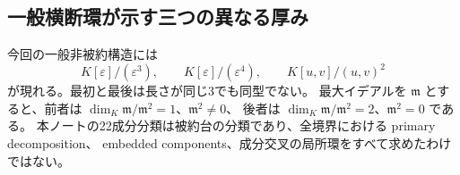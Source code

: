 \subsection{一般横断環が示す三つの異なる厚み}
今回の一般非被約構造には
\[
 K[\varepsilon]/(\varepsilon^3),\qquad
 K[\varepsilon]/(\varepsilon^4),\qquad
 K[u,v]/(u,v)^2
\]
が現れる。最初と最後は長さが同じ3でも同型でない。
最大イデアルを $\mathfrak m$ とすると、前者は
$\dim_K\mathfrak m/\mathfrak m^2=1$、$\mathfrak m^2\ne0$、
後者は $\dim_K\mathfrak m/\mathfrak m^2=2$、$\mathfrak m^2=0$ である。
本ノートの22成分分類は被約台の分類であり、全境界における primary decomposition、
embedded components、成分交叉の局所環をすべて求めたわけではない。
